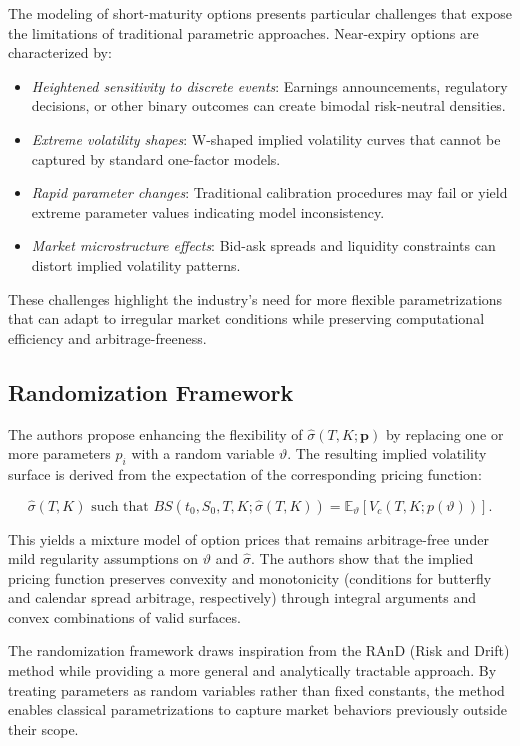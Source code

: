 The modeling of short-maturity options presents particular challenges that expose the limitations of traditional parametric approaches. Near-expiry options are characterized by:

\begin{itemize}
    \item \textit{Heightened sensitivity to discrete events}: Earnings announcements, regulatory decisions, or other binary outcomes can create bimodal risk-neutral densities.
    \item \textit{Extreme volatility shapes}: W-shaped implied volatility curves that cannot be captured by standard one-factor models.
    \item \textit{Rapid parameter changes}: Traditional calibration procedures may fail or yield extreme parameter values indicating model inconsistency.
    \item \textit{Market microstructure effects}: Bid-ask spreads and liquidity constraints can distort implied volatility patterns.
\end{itemize}

These challenges highlight the industry's need for more flexible parametrizations that can adapt to irregular market conditions while preserving computational efficiency and arbitrage-freeness.

\subsection{Randomization Framework}

The authors propose enhancing the flexibility of $\hat{\sigma}(T,K; \mathbf{p})$ by replacing one or more parameters $p_i$ with a random variable $\vartheta$. The resulting implied volatility surface is derived from the expectation of the corresponding pricing function:

\[
    \hat{\sigma}(T,K) \text{ such that } BS(t_0, S_0, T, K; \hat{\sigma}(T,K)) = \mathbb{E}_{\vartheta}[V_c(T,K; p(\vartheta))].
\]

This yields a mixture model of option prices that remains arbitrage-free under mild regularity assumptions on $\vartheta$ and $\hat{\sigma}$. The authors show that the implied pricing function preserves convexity and monotonicity (conditions for butterfly and calendar spread arbitrage, respectively) through integral arguments and convex combinations of valid surfaces.

The randomization framework draws inspiration from the RAnD (Risk and Drift) method while providing a more general and analytically tractable approach. By treating parameters as random variables rather than fixed constants, the method enables classical parametrizations to capture market behaviors previously outside their scope.

